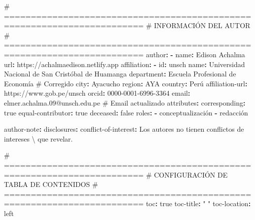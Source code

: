 \documentclass[
  doc,
  floatsintext,
  longtable,
  a4paper,
  nolmodern,
  notxfonts,
  notimes,
  12pt,
  colorlinks=true,linkcolor=blue,citecolor=blue,urlcolor=blue]{apa7}
\newenvironment{Shaded}{\begin{snugshade}}{\end{snugshade}}
\newcommand{\AttributeTok}[1]{\textcolor[rgb]{0.40,0.45,0.13}{#1}}
\newcommand{\CharTok}[1]{\textcolor[rgb]{0.13,0.47,0.30}{#1}}
\newcommand{\CommentTok}[1]{\textcolor[rgb]{0.37,0.37,0.37}{#1}}
\newcommand{\FunctionTok}[1]{\textcolor[rgb]{0.28,0.35,0.67}{#1}}
\newcommand{\KeywordTok}[1]{\textcolor[rgb]{0.00,0.23,0.31}{\textbf{#1}}}
\newcommand{\StringTok}[1]{\textcolor[rgb]{0.13,0.47,0.30}{#1}}
\begin{document}
\begin{Shaded}
\begin{Highlighting}[]
\CommentTok{\# ========================================================================}
\CommentTok{\# INFORMACIÓN DEL AUTOR}
\CommentTok{\# ========================================================================}
\FunctionTok{author}\KeywordTok{:}
\AttributeTok{  }\KeywordTok{{-}}\AttributeTok{ }\FunctionTok{name}\KeywordTok{:}\AttributeTok{ Edison Achalma}
\AttributeTok{    }\FunctionTok{url}\KeywordTok{:}\AttributeTok{ https://achalmaedison.netlify.app}
\AttributeTok{    }\FunctionTok{affiliation}\KeywordTok{:}
\AttributeTok{      }\KeywordTok{{-}}\AttributeTok{ }\FunctionTok{id}\KeywordTok{:}\AttributeTok{ unsch}
\AttributeTok{        }\FunctionTok{name}\KeywordTok{:}\AttributeTok{ Universidad Nacional de San Cristóbal de Huamanga}
\AttributeTok{        }\FunctionTok{department}\KeywordTok{:}\AttributeTok{ Escuela Profesional de Economía}\CommentTok{  \# Corregido}
\AttributeTok{        }\FunctionTok{city}\KeywordTok{:}\AttributeTok{ Ayacucho}
\AttributeTok{        }\FunctionTok{region}\KeywordTok{:}\AttributeTok{ AYA}
\AttributeTok{        }\FunctionTok{country}\KeywordTok{:}\AttributeTok{ Perú}
\AttributeTok{    }\FunctionTok{affiliation{-}url}\KeywordTok{:}\AttributeTok{ https://www.gob.pe/unsch}
\AttributeTok{    }\FunctionTok{orcid}\KeywordTok{:}\AttributeTok{ 0000{-}0001{-}6996{-}3364}
\AttributeTok{    }\FunctionTok{email}\KeywordTok{:}\AttributeTok{ elmer.achalma.09@unsch.edu.pe}\CommentTok{  \# Email actualizado}
\AttributeTok{    }\FunctionTok{attributes}\KeywordTok{:}
\AttributeTok{      }\FunctionTok{corresponding}\KeywordTok{:}\AttributeTok{ }\CharTok{true}
\AttributeTok{      }\FunctionTok{equal{-}contributor}\KeywordTok{:}\AttributeTok{ }\CharTok{true}
\AttributeTok{      }\FunctionTok{deceased}\KeywordTok{:}\AttributeTok{ }\CharTok{false}
\AttributeTok{    }\FunctionTok{roles}\KeywordTok{:}
\AttributeTok{      }\KeywordTok{{-}}\AttributeTok{ conceptualización}
\AttributeTok{      }\KeywordTok{{-}}\AttributeTok{ redacción}

\FunctionTok{author{-}note}\KeywordTok{:}
\AttributeTok{  }\FunctionTok{disclosures}\KeywordTok{:}
\AttributeTok{    }\FunctionTok{conflict{-}of{-}interest}\KeywordTok{:}\AttributeTok{ Los autores no tienen conflictos de intereses \textbackslash{}}
\AttributeTok{    que revelar.}

\CommentTok{\# ========================================================================}
\CommentTok{\# CONFIGURACIÓN DE TABLA DE CONTENIDOS}
\CommentTok{\# ========================================================================}
\FunctionTok{toc}\KeywordTok{:}\AttributeTok{ }\CharTok{true}
\FunctionTok{toc{-}title}\KeywordTok{:}\AttributeTok{ }\StringTok{" "}
\FunctionTok{toc{-}location}\KeywordTok{:}\AttributeTok{ left}


\end{Highlighting}
\end{Shaded}
\end{document}
